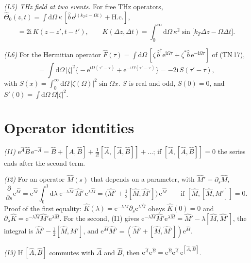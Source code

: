 \documentclass[aps,pra,onecolumn,notitlepage,11pt,amsmath,amssymb,nofootinbib]{revtex4-2}
\newcommand{\dd}{\mathrm{d}}
\newcommand{\ee}{\mathrm{e}}
\newcommand{\ii}{\mathrm{i}}
\begin{document}
\emph{(L5) THz field at two events.} For free THz operators,
$\hat\Theta_0(z,t)=\int\dd\Omega\,\kappa\,[\hat b\,\ee^{\ii(k_Tz-\Omega t)}+\mathrm{H.c.}]$,
\begin{equation}
[\hat\Theta_0(z,t),\hat\Theta_0(z',t')]=2\ii\,K(z-z',t-t'),\qquad
K(\Delta z,\Delta t)=\int_0^\infty\!\!\dd\Omega\,\kappa^2\sin\!\big[k_T\Delta z-\Omega\Delta t\big].
\label{eq:L5}
\end{equation}

\emph{(L6)} For the Hermitian operator
$\hat F(\tau)=\int\dd\Omega\,[\zeta\,\hat b^\dagger\ee^{\ii\Omega\tau}+\zeta^*\hat b\,\ee^{-\ii\Omega\tau}]$
of (TN\,17),
\begin{equation}
[\hat F(\tau'),\hat F(\tau)]
=\int\!\dd\Omega\,|\zeta|^2\Big\{-\ee^{\ii\Omega(\tau'-\tau)}+\ee^{-\ii\Omega(\tau'-\tau)}\Big\}
=-2\ii\,S(\tau'-\tau),
\label{eq:L6}
\end{equation}
with $S(x)=\int_0^\infty\dd\Omega\,|\zeta(\Omega)|^2\sin\Omega x$.
$S$ is real and odd, $S(0)=0$, and $S'(0)=\int\dd\Omega\,\Omega|\zeta|^2$.

\section{Operator identities}
\label{sec:ident}

\emph{(I1)} $\ee^{\hat A}\hat B\,\ee^{-\hat A}=\hat B+[\hat A,\hat B]
+\frac{1}{2!}[\hat A,[\hat A,\hat B]]+\dots$; if
$[\hat A,[\hat A,\hat B]]=0$ the series ends after the second term.

\emph{(I2)} For an operator $\hat M(s)$ that depends on a parameter, with
$\hat M'=\partial_s\hat M$,
\begin{equation}
\frac{\partial}{\partial s}\ee^{\hat M}
=\ee^{\hat M}\!\int_0^1\!\dd\lambda\;\ee^{-\lambda\hat M}\,\hat M'\,\ee^{\lambda\hat M}
=\Big(\hat M'+\tfrac12[\hat M,\hat M']\Big)\,\ee^{\hat M}
\qquad\text{if }[\hat M,[\hat M,\hat M']]=0 .
\label{eq:I2}
\end{equation}
Proof of the first equality:
$\hat K(\lambda)=\ee^{-\lambda\hat M}\partial_s\ee^{\lambda\hat M}$ obeys
$\hat K(0)=0$ and
$\partial_\lambda\hat K=\ee^{-\lambda\hat M}\hat M'\ee^{\lambda\hat M}$. For
the second, (I1) gives
$\ee^{-\lambda\hat M}\hat M'\ee^{\lambda\hat M}=\hat M'-\lambda[\hat M,\hat M']$,
the integral is $\hat M'-\tfrac12[\hat M,\hat M']$, and
$\ee^{\hat M}\hat M'=(\hat M'+[\hat M,\hat M'])\ee^{\hat M}$.

\emph{(I3)} If $[\hat A,\hat B]$ commutes with $\hat A$ and $\hat B$, then
$\ee^{\hat A}\ee^{\hat B}=\ee^{\hat B}\ee^{\hat A}\,\ee^{[\hat A,\hat B]}$.
\end{document}
